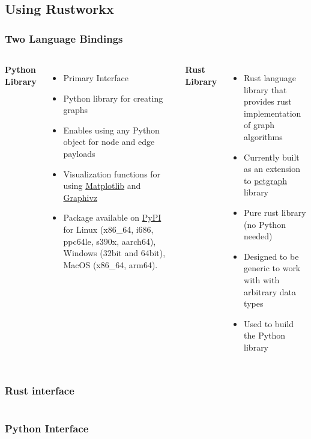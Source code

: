 \documentclass[aspectratio=169,11pt,hyperref={colorlinks=true}]{beamer}
\begin{document}
\subsection{Using Rustworkx}
\begin{frame}
    \frametitle{Two Language Bindings}
    \begin{columns}
        \textbf{Python Library}
        \begin{itemize}
            \item Primary Interface
            \item Python library for creating graphs
            \item Enables using any Python object for node and edge payloads
            \item Visualization functions for using \href{https://matplotlib.org/}{Matplotlib} and \href{https://graphviz.org/}{Graphivz}
            \item Package available on \href{https://pypi.org/project/rustworkx/}{PyPI} for Linux (x86\_64, i686, ppc64le, s390x, aarch64), Windows (32bit and 64bit), MacOS (x86\_64, arm64).
        \end{itemize}
        \textbf{Rust Library}
        \begin{itemize}
            \item Rust language library that provides rust implementation of graph algorithms
            \item Currently built as an extension to \href{https://docs.rs/petgraph/latest/petgraph/}{petgraph} library
            \item Pure rust library (no Python needed)
            \item Designed to be generic to work with with arbitrary data types
            \item Used to build the Python library
        \end{itemize}
    \end{columns}
\end{frame}

\begin{frame}
    \frametitle{Rust interface}
    \inputminted{Rust}{rust_example.rs}
\end{frame}

\begin{frame}
    \frametitle{Python Interface}
    \inputminted{Python}{python_example.py}
\end{frame}
\end{document}
